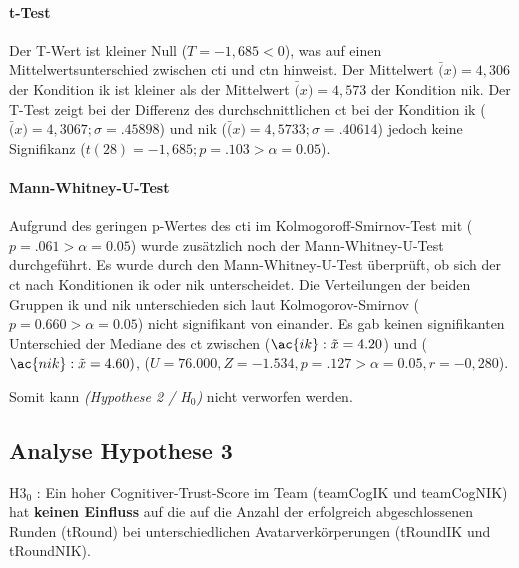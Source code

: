 \documentclass[a4paper,11pt]{article}%
\renewcommand{\\}{\vspace*{0.5\baselineskip} \newline}
\begin{document}
\paragraph{t-Test}
Der T-Wert ist kleiner Null ($T = -1,685 < 0$), was auf einen Mittelwertsunterschied zwischen \ac{cti} und \ac{ctn} hinweist. Der Mittelwert $\bar(x) = 4,306$ der Kondition \ac{ik} ist kleiner als der Mittelwert $\bar(x) = 4,573$ der Kondition \ac{nik}.
Der T-Test zeigt bei der Differenz des durchschnittlichen \ac{ct} bei der Kondition \ac{ik} ($\bar(x) = 4,3067; \sigma = .45898$) und \ac{nik} ($\bar(x) = 4,5733; \sigma =.40614$) jedoch keine Signifikanz ($t(28) = -1,685; p = .103 > \alpha = 0.05$).

\paragraph{Mann-Whitney-U-Test}
Aufgrund des geringen p-Wertes des \ac{cti} im Kolmogoroff-Smirnov-Test mit ($p = .061 > \alpha = 0.05$) wurde zusätzlich noch der Mann-Whitney-U-Test durchgeführt.
Es wurde durch den Mann-Whitney-U-Test überprüft, ob sich der \ac{ct} nach Konditionen \ac{ik} oder \ac{nik} unterscheidet. Die Verteilungen der beiden Gruppen \ac{ik} und \ac{nik} unterschieden sich  laut Kolmogorov-Smirnov ($p = 0.660 > \alpha = 0.05$) nicht signifikant von einander. Es gab keinen signifikanten Unterschied der Mediane des \ac{ct} zwischen ($\ac{ik} : \tilde x = 4.20$) und ($\ac{nik} : \tilde x = 4.60)$, ($U = 76.000, Z = -1.534, p = .127 > \alpha = 0.05, r =-0,280$).

Somit kann \textit{(Hypothese 2 / H$_{0}$)} nicht verworfen werden.

\newpage
\subsection{Analyse Hypothese 3}
H3$_{0}$ : Ein hoher Cognitiver-Trust-Score im Team (\ac{teamCogIK} und \ac{teamCogNIK}) hat \textbf{keinen Einfluss} auf die auf die Anzahl der erfolgreich abgeschlossenen Runden (\ac{tRound}) bei unterschiedlichen Avatarverkörperungen (\ac{tRoundIK} und \ac{tRoundNIK}).
\end{document}
